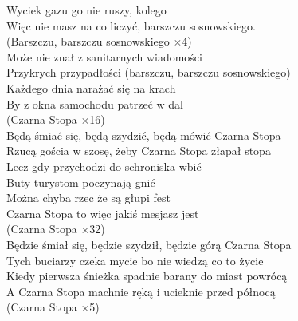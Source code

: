 \documentclass[a5paper, 10pt]{book}
\begin{document}
\begin{minipage}[t]{0.9\textwidth}
Wyciek gazu go nie ruszy, kolego\\
Więc nie masz na co liczyć, barszczu sosnowskiego.\\
(Barszczu, barszczu sosnowskiego $\times$4) \vspace*{1.5mm}
\\
Może nie znał z sanitarnych wiadomości\\
Przykrych przypadłości (barszczu, barszczu sosnowskiego)\\
Każdego dnia narażać się na krach\\
By z okna samochodu patrzeć w dal \vspace*{1.5mm}
\\
\hspace*{5mm}(Czarna Stopa $\times$16)\\
\hspace*{5mm}Będą śmiać się, będą szydzić, będą mówić Czarna Stopa\\
\hspace*{5mm}Rzucą gościa w szosę, żeby Czarna Stopa złapał stopa \vspace*{1.5mm}
\\
Lecz gdy przychodzi do schroniska wbić\\
Buty turystom poczynają gnić\\
Można chyba rzec że są głupi fest\\
Czarna Stopa to więc jakiś mesjasz jest \vspace*{1.5mm}
\\
\hspace*{5mm}(Czarna Stopa $\times$32)\\
\hspace*{5mm}Będzie śmiał się, będzie szydził, będzie górą Czarna Stopa\\
\hspace*{5mm}Tych buciarzy czeka mycie bo nie wiedzą co to życie\\
\hspace*{5mm}Kiedy pierwsza śnieżka spadnie barany do miast powrócą\\
\hspace*{5mm}A Czarna Stopa machnie ręką i ucieknie przed północą \\
\hspace*{5mm}(Czarna Stopa $\times$5)\\
\end{minipage}
\begin{minipage}[t]{0.1\textwidth}
\end{minipage}
\end{document}
